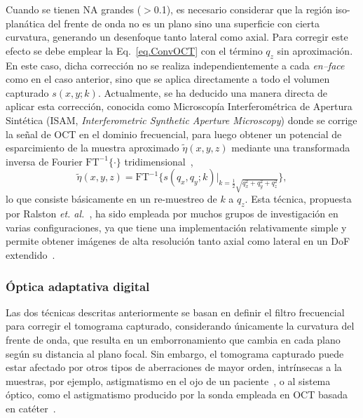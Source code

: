\documentclass[letter, 12 pt]{article}
\begin{document}
Cuando se tienen NA grandes ($>$0.1), es necesario considerar que la región iso-planática del frente de onda no es un plano sino una superficie con cierta curvatura, generando un desenfoque tanto lateral como axial. Para corregir este efecto se debe emplear la Eq.~\eqref{eq.ConvOCT} con el término $q_z$ sin aproximación. En este caso, dicha corrección no se realiza independientemente a cada \textit{en--face} como en el caso anterior, sino que se aplica directamente a todo el volumen capturado $s(x,y;k)$. Actualmente, se ha deducido una manera directa de aplicar esta corrección, conocida como Microscopía Interferométrica de Apertura Sintética (ISAM, \textit{Interferometric Synthetic Aperture Microscopy}) donde se corrige la señal de OCT en el dominio frecuencial, para luego obtener un potencial de esparcimiento de la muestra aproximado $\tilde{\eta}(x,y,z)$ mediante una transformada inversa de Fourier $\text{FT}^{-1}\{\cdot\}$ tridimensional~\cite{ralston2007},
    \begin{equation}
\tilde{\eta}(x,y,z) = \text{FT}^{-1}\bigg\{s(q_x, q_y; k)\bigg|_{k = \frac{1}{2}\sqrt{q_x^2+q_y^2+q_z^2}}\bigg\},
    \end{equation}
lo que consiste básicamente en un re-muestreo de $k$ a $q_z$. Esta técnica, propuesta por Ralston \textit{et. al.}~\cite{ralston2007}, ha sido empleada por muchos grupos de investigación en varias configuraciones, ya que tiene una implementación relativamente simple y permite obtener imágenes de alta resolución tanto axial como lateral en un DoF extendido~\cite{Chen2010_Approximate, Chen2010_Sdoct}.

\subsubsection{Óptica adaptativa digital}

Las dos técnicas descritas anteriormente se basan en definir el filtro frecuencial para corregir el tomograma capturado, considerando únicamente la curvatura del frente de onda, que resulta en un emborronamiento que cambia en cada plano según su distancia al plano focal. Sin embargo, el tomograma capturado puede estar afectado por otros tipos de aberraciones de mayor orden, intrínsecas a la muestras, por ejemplo, astigmatismo en el ojo de un paciente~\cite{thibos2002}, o al sistema óptico, como el astigmatismo producido por la sonda empleada en OCT basada en catéter~\cite{wang2012, xi2009a}. \\
\end{document}
